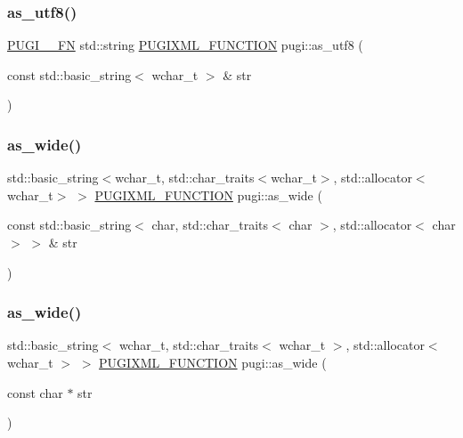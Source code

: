 \subsubsection{\texorpdfstring{as\+\_\+utf8()}{as\_utf8()}\hspace{0.1cm}{\footnotesize\ttfamily [3/3]}}
{\footnotesize\ttfamily \hyperlink{pugixml_8cpp_a82c335af3ca48cdb209c506bf8dd6ad2}{P\+U\+G\+I\+\_\+\+\_\+\+FN} std\+::string \hyperlink{pugixml_8hpp_a3d91f8ab11645e6dac8783d86d152b31}{P\+U\+G\+I\+X\+M\+L\+\_\+\+F\+U\+N\+C\+T\+I\+ON} pugi\+::as\+\_\+utf8 (\begin{DoxyParamCaption}\item[{const std\+::basic\+\_\+string$<$ wchar\+\_\+t $>$ \&}]{str }\end{DoxyParamCaption})}

\mbox{\label{namespacepugi_a14a429e10cd9296114544306b7228d09}} 
\subsubsection{\texorpdfstring{as\+\_\+wide()}{as\_wide()}\hspace{0.1cm}{\footnotesize\ttfamily [1/3]}}
{\footnotesize\ttfamily std\+::basic\+\_\+string$<$wchar\+\_\+t, std\+::char\+\_\+traits$<$wchar\+\_\+t$>$, std\+::allocator$<$wchar\+\_\+t$>$ $>$ \hyperlink{pugixml_8hpp_a3d91f8ab11645e6dac8783d86d152b31}{P\+U\+G\+I\+X\+M\+L\+\_\+\+F\+U\+N\+C\+T\+I\+ON} pugi\+::as\+\_\+wide (\begin{DoxyParamCaption}\item[{const std\+::basic\+\_\+string$<$ char, std\+::char\+\_\+traits$<$ char $>$, std\+::allocator$<$ char $>$ $>$ \&}]{str }\end{DoxyParamCaption})}

\mbox{\label{namespacepugi_ae372a27a1d2b6a23e431155820fbf166}} 
\subsubsection{\texorpdfstring{as\+\_\+wide()}{as\_wide()}\hspace{0.1cm}{\footnotesize\ttfamily [2/3]}}
{\footnotesize\ttfamily std\+::basic\+\_\+string$<$ wchar\+\_\+t, std\+::char\+\_\+traits$<$ wchar\+\_\+t $>$, std\+::allocator$<$ wchar\+\_\+t $>$ $>$ \hyperlink{pugixml_8hpp_a3d91f8ab11645e6dac8783d86d152b31}{P\+U\+G\+I\+X\+M\+L\+\_\+\+F\+U\+N\+C\+T\+I\+ON} pugi\+::as\+\_\+wide (\begin{DoxyParamCaption}\item[{const char $\ast$}]{str }\end{DoxyParamCaption})}

